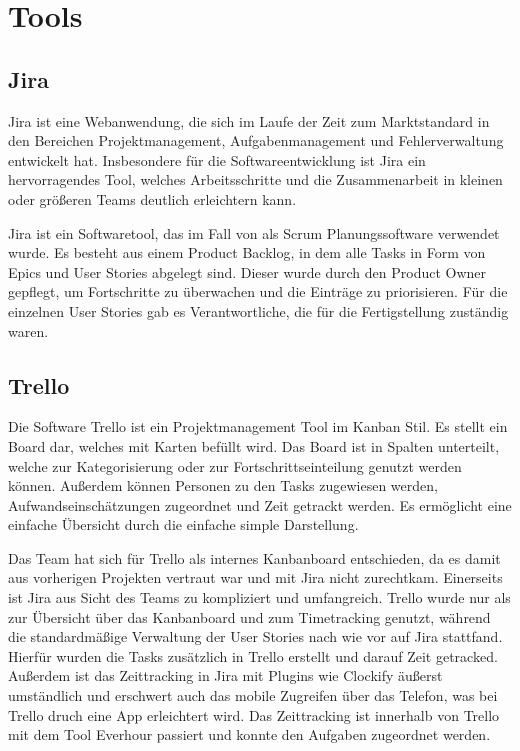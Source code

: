 
%


\section{Tools}\label{sec:tools}

\renewcommand{\kapitelautor}{Autor: Nils Hubmann}

\subsection{Jira}\label{subsec:jira}
%

\begin{coolQuote}
Jira ist eine Webanwendung, die sich im Laufe der Zeit zum Marktstandard in den Bereichen Projektmanagement, Aufgabenmanagement und Fehlerverwaltung entwickelt hat.
Insbesondere für die Softwareentwicklung ist Jira ein hervorragendes Tool, welches Arbeitsschritte und die Zusammenarbeit in kleinen oder größeren Teams deutlich erleichtern kann.
\end{coolQuote}

Jira ist ein Softwaretool, das im Fall von \ff als Scrum Planungssoftware verwendet wurde.
Es besteht aus einem Product Backlog, in dem alle Tasks in Form von Epics und User Stories abgelegt sind.
Dieser wurde durch den Product Owner gepflegt, um Fortschritte zu überwachen und die Einträge zu priorisieren.
Für die einzelnen User Stories gab es Verantwortliche, die für die Fertigstellung zuständig waren.


\subsection{Trello}\label{subsec:Trello}
%
Die Software Trello ist ein Projektmanagement Tool im Kanban Stil.
Es stellt ein Board dar, welches mit Karten befüllt wird.
Das Board ist in Spalten unterteilt, welche zur Kategorisierung oder zur Fortschrittseinteilung genutzt werden können.
Außerdem können Personen zu den Tasks zugewiesen werden, Aufwandseinschätzungen zugeordnet und Zeit getrackt werden.
Es ermöglicht eine einfache Übersicht durch die einfache simple Darstellung.

Das Team hat sich für Trello als internes Kanbanboard entschieden, da es damit aus vorherigen Projekten vertraut war und mit Jira nicht zurechtkam.
Einerseits ist Jira aus Sicht des Teams zu kompliziert und umfangreich.
Trello wurde nur als zur Übersicht über das Kanbanboard und zum Timetracking genutzt, während die standardmäßige Verwaltung der User Stories nach wie vor auf Jira stattfand.
Hierfür wurden die Tasks zusätzlich in Trello erstellt und darauf Zeit getracked.
Außerdem ist das Zeittracking in Jira mit Plugins wie Clockify äußerst umständlich und erschwert auch das mobile Zugreifen über das Telefon, was bei Trello druch eine App erleichtert wird.
Das Zeittracking ist innerhalb von Trello mit dem Tool Everhour passiert und konnte den Aufgaben zugeordnet werden.

